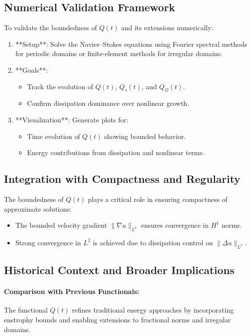 \subsection{Numerical Validation Framework}
To validate the boundedness of $Q(t)$ and its extensions numerically:
\begin{enumerate}
    \item **Setup**: Solve the Navier--Stokes equations using Fourier spectral methods for periodic domains or finite-element methods for irregular domains.
    \item **Goals**:
        \begin{itemize}
            \item Track the evolution of $Q(t)$, $Q_s(t)$, and $Q_\Omega(t)$.
            \item Confirm dissipation dominance over nonlinear growth.
        \end{itemize}
    \item **Visualization**: Generate plots for:
        \begin{itemize}
            \item Time evolution of $Q(t)$ showing bounded behavior.
            \item Energy contributions from dissipation and nonlinear terms.
        \end{itemize}
\end{enumerate}

\subsection{Integration with Compactness and Regularity}
The boundedness of $Q(t)$ plays a critical role in ensuring compactness of approximate solutions:
\begin{itemize}
    \item The bounded velocity gradient $\|\nabla u\|_{L^2}$ ensures convergence in $H^1$ norms.
    \item Strong convergence in $L^2$ is achieved due to dissipation control on $\|\Delta u\|_{L^2}$.
\end{itemize}

\subsection{Historical Context and Broader Implications}
\paragraph{Comparison with Previous Functionals:} The functional $Q(t)$ refines traditional energy approaches by incorporating enstrophy bounds and enabling extensions to fractional norms and irregular domains.
